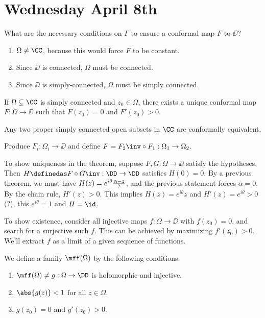 \hypertarget{wednesday-april-8th}{%
\section{Wednesday April 8th}\label{wednesday-april-8th}}

What are the necessary conditions on \(\Gamma\) to ensure a conformal
map \(F\) to \(\DD\)?

\begin{enumerate}
\def\labelenumi{\arabic{enumi}.}
\tightlist
\item
  \(\Omega \neq \CC\), because this would force \(F\) to be constant.
\item
  Since \(\DD\) is connected, \(\Omega\) must be connected.
\item
  Since \(\DD\) is simply-connected, \(\Omega\) must be simply
  connected.
\end{enumerate}

\begin{description}
\tightlist
\item[Theorem]
If \(\Omega \subsetneq \CC\) is simply connected and \(z_0 \in \Omega\),
there exists a unique conformal map \(F: \Omega \to \DD\) such that
\(F(z_0) = 0\) and \(F'(z_0) > 0\).
\item[Corollary]
Any two proper simply connected open subsets in \(\CC\) are conformally
equivalent.
\item[Proof]
Produce \(F_i: \Omega_i \to \DD\) and define
\(F = F_2\inv \circ F_1: \Omega_1 \to \Omega_2\).
\end{description}

To show uniqueness in the theorem, suppose \(F, G: \Omega \to \DD\)
satisfy the hypotheses. Then \(H \definedas F\circ G\inv: \DD \to \DD\)
satisfies \(H(0) = 0\). By a previous theorem, we must have
\(H(z) = e^{i\theta} {\alpha - z \over ?}\), and the previous statement
forces \(\alpha = 0\). By the chain rule, \(H'(z) > 0\). This implies
\(H(z) = e^{i\theta} z\) and \(H'(z) = e^{i\theta} > 0\) (?), this
\(e^{i\theta} = 1\) and \(H = \id\).

To show existence, consider all injective maps \(f: \Omega \to \DD\)
with \(f(z_0) = 0\), and search for a surjective such \(f\). This can be
achieved by maximizing \(f'(z_0) > 0\). We'll extract \(f\) as a limit
of a given sequence of functions.

We define a family \(\mff(\Omega)\) by the following conditions:

\begin{enumerate}
\def\labelenumi{\alph{enumi}.}
\tightlist
\item
  \(\mff(\Omega) \neq g: \Omega \to \DD\) is holomorphic and injective.
\item
  \(\abs{g(z)} < 1\) for all \(z\in \Omega\).
\item
  \(g(z_0) = 0\) and \(g'(z_0) > 0\).
\end{enumerate}

